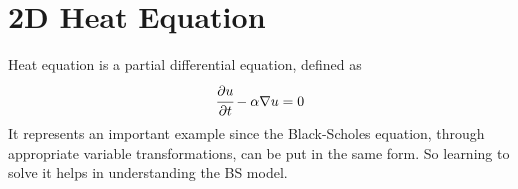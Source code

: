 %
%
%
%
%
%
%
%
%
%

\section{2D Heat Equation}
Heat equation is a partial differential equation, defined as
\begin{equation}
\cfrac{\partial u}{\partial t} - \alpha\nabla u = 0
\end{equation}
\noindent 
It represents an important example since the Black-Scholes equation, through appropriate variable transformations, can be put in the same form. So learning to solve it helps in understanding the BS model.

